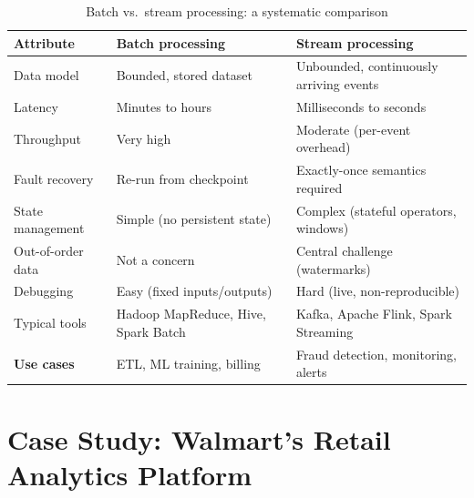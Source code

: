 \begin{table}[h!t]
\centering
\caption{Batch vs.\ stream processing: a systematic comparison}
\label{tab:batch-stream}
\renewcommand{\arraystretch}{1.45}
\begin{tabular}{L{2.6cm} L{3.1cm} L{3.9cm}}
\toprule
\textbf{Attribute}      & \textbf{Batch processing}    & \textbf{Stream processing} \\
\midrule
Data model              & Bounded, stored dataset      & Unbounded, continuously arriving events \\
Latency                 & Minutes to hours             & Milliseconds to seconds \\
Throughput              & Very high                    & Moderate (per-event overhead) \\
Fault recovery          & Re-run from checkpoint       & Exactly-once semantics required \\
State management        & Simple (no persistent state) & Complex (stateful operators, windows) \\
Out-of-order data       & Not a concern                & Central challenge (watermarks) \\
Debugging               & Easy (fixed inputs/outputs)  & Hard (live, non-reproducible) \\
Typical tools           & Hadoop MapReduce, Hive, Spark Batch & Kafka, Apache Flink, Spark Streaming \\
\textbf{Use cases}      & ETL, ML training, billing    & Fraud detection, monitoring, alerts \\
\bottomrule
\end{tabular}
\end{table}



\section{Case Study: Walmart's Retail Analytics Platform}
\label{sec:walmart-case}


